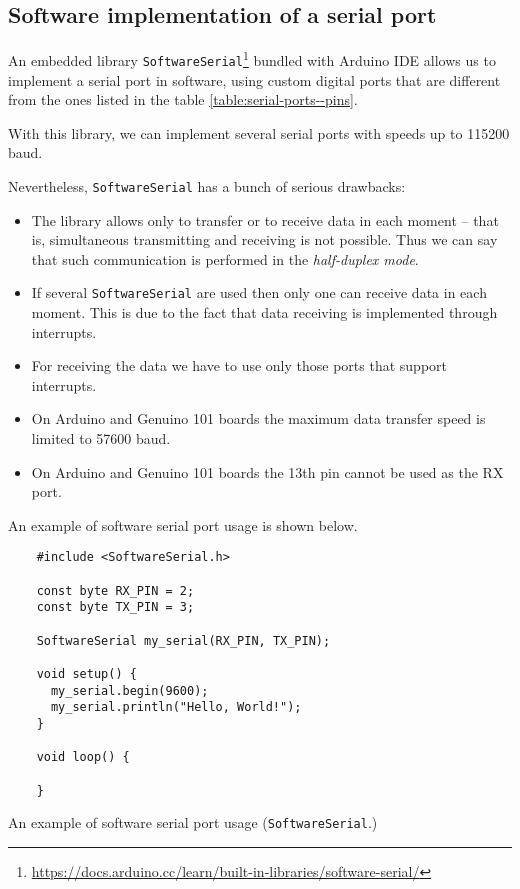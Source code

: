 \documentclass[../sparc.tex]{subfiles}
\begin{document}
\subsection{Software implementation of a serial port}

An embedded library
\texttt{SoftwareSerial}\footnote{\url{https://docs.arduino.cc/learn/built-in-libraries/software-serial/}}
bundled with Arduino IDE allows us to implement a serial port in software, using
custom digital ports that are different from the ones listed in the table
\ref{table:serial-ports--pins}.

With this library, we can implement several serial ports with speeds up to
115200 baud.

Nevertheless, \texttt{SoftwareSerial} has a bunch of serious drawbacks:
\begin{itemize}
\item The library allows only to transfer or to receive data in each moment --
  that is, simultaneous transmitting and receiving is not possible. Thus we can
  say that such communication is performed in the \emph{half-duplex mode}.
\item If several \texttt{SoftwareSerial} are used then only one can receive data
  in each moment. This is due to the fact that data receiving is implemented
  through interrupts.
\item For receiving the data we have to use only those ports that support
  interrupts.
\item On Arduino and Genuino 101 boards the maximum data transfer speed is
  limited to 57600 baud.
\item On Arduino and Genuino 101 boards the 13th pin cannot be used as the RX
  port.
\end{itemize}

An example of software serial port usage is shown below.

\begin{listing}[H]
  \begin{verbatim}
    #include <SoftwareSerial.h>

    const byte RX_PIN = 2;
    const byte TX_PIN = 3;

    SoftwareSerial my_serial(RX_PIN, TX_PIN);

    void setup() {
      my_serial.begin(9600);
      my_serial.println("Hello, World!");
    }

    void loop() {

    }
  \end{verbatim}
  \label{listing:communication-serial-software}
  \caption{An example of software serial port usage (\texttt{SoftwareSerial}.)}
\end{listing}
\end{document}

